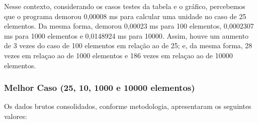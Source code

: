 \documentclass[a4paper, 12pt]{article}
\begin{document}
\vspace{0.8cm}
Nesse contexto, considerando os casos testes da tabela e o gráfico, percebemos que o programa demorou 0,00008 ms para calcular uma unidade no caso de 25 elementos. Da mesma forma, demorou 0,00023 ms para 100 elementos, 0,0002307 ms para 1000 elementos e 0,0148924 ms para 10000. Assim, houve um aumento de 3 vezes do caso de 100 elementos em relação ao de 25; e, da mesma forma, 28 vezes em relaçao ao de 1000 elementos e 186 vezes em relaçao ao de 10000 elementos.

\subsubsection{Melhor Caso (25, 10, 1000 e 10000 elementos)}

Os dados brutos consolidados, conforme metodologia, apresentaram os seguintes valores:
\vspace{0.2cm}
\end{document}
